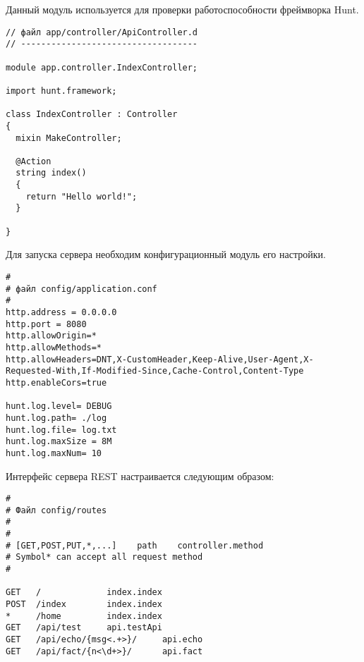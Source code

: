 \documentclass{studrep}
\begin{document}
Данный модуль используется для проверки работоспособности фреймворка Hunt.
\begin{verbatim}
// файл app/controller/ApiController.d
// -----------------------------------

module app.controller.IndexController;

import hunt.framework;

class IndexController : Controller
{
  mixin MakeController;

  @Action
  string index()
  {
    return "Hello world!";
  }

}
\end{verbatim}

Для запуска сервера необходим конфигурационный модуль его настройки.
\begin{verbatim}
#
# файл config/application.conf
#
http.address = 0.0.0.0
http.port = 8080
http.allowOrigin=*
http.allowMethods=*
http.allowHeaders=DNT,X-CustomHeader,Keep-Alive,User-Agent,X-Requested-With,If-Modified-Since,Cache-Control,Content-Type
http.enableCors=true

hunt.log.level= DEBUG
hunt.log.path= ./log
hunt.log.file= log.txt
hunt.log.maxSize = 8M
hunt.log.maxNum= 10
\end{verbatim}

Интерфейс сервера REST настраивается следующим образом:
\begin{verbatim}
#
# Файл config/routes
#
#
# [GET,POST,PUT,*,...]    path    controller.method
# Symbol* can accept all request method
#

GET   /             index.index
POST  /index        index.index
*     /home         index.index
GET   /api/test     api.testApi
GET   /api/echo/{msg<.+>}/     api.echo
GET   /api/fact/{n<\d+>}/      api.fact
\end{verbatim}
\end{document}
